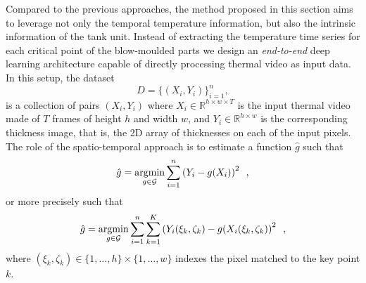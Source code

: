 Compared to the previous approaches, the method proposed in this section aims to leverage not only the temporal temperature information, but also the intrinsic information of the tank unit. Instead of extracting the temperature time series for each critical point of the blow-moulded parts we design an \textit{end-to-end} deep learning architecture capable of directly processing thermal video as input data. In this setup, the dataset
\begin{equation}
    D = \{(X_{i}, Y_{i})\}_{i=1}^{n},
\end{equation}
is a collection of pairs $(X_{i}, Y_{i})$ where $X_{i} \in \mathds{R}^{h \times w \times T}$ is the input thermal video made of $T$ frames of height $h$ and width $w$, and $Y_{i} \in \mathds{R}^{h \times w}$ is the corresponding thickness image, that is, the 2D array of thicknesses on each of the input pixels. The role of the spatio-temporal approach is to estimate a function $\hat{g}$ such that
\begin{equation}
    \hat{g} = \operatorname*{argmin}_{g\in\mathcal{G}} \sum_{i=1}^n \left( Y_{i} - g(X_{i})\right)^2 \enspace,
\end{equation}
or more precisely such that
\begin{equation}
    \hat{g} = \operatorname*{argmin}_{g\in\mathcal{G}} \sum_{i=1}^n \sum_{k=1}^K \left( Y_{i}(\xi_{k}, \zeta_{k}) - g(X_{i}(\xi_{k}, \zeta_{k})\right)^2 \enspace,
\end{equation}
where $(\xi_{k}, \zeta_{k}) \in \{1,\ldots,h\}\times\{1,\ldots,w\}$ indexes the pixel matched to the key point $k$.

